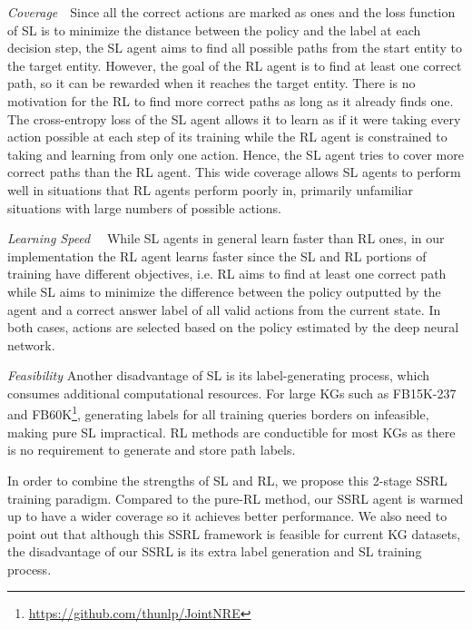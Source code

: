 \documentclass[lettersize,journal]{IEEEtran}
\begin{document}
\textit{Coverage}~~Since all the correct actions are marked as ones and the loss function of SL is to minimize the distance between the policy and the label at each decision step, the SL agent aims to find all possible paths from the start entity to the target entity. However, the goal of the RL agent is to find at least one correct path, so it can be rewarded when it reaches the target entity. There is no motivation for the RL to find more correct paths as long as it already finds one. The cross-entropy loss of the SL agent allows it to learn as if it were taking every action possible at each step of its training while the RL agent is constrained to taking and learning from only one action. Hence, the SL agent tries to cover more correct paths than the RL agent. This wide coverage allows SL agents to perform well in situations that RL agents perform poorly in, primarily unfamiliar situations with large numbers of possible actions.

\textit{Learning Speed}~~
While SL agents in general learn faster than RL ones, in our implementation the RL agent learns faster since the SL and RL portions of training have different objectives, i.e. RL aims to find at least one correct path while SL aims to minimize the difference between the policy outputted by the agent and a correct answer label of all valid actions from the current state. In both cases, actions are selected based on the policy estimated by the deep neural network.

\textit{Feasibility} Another disadvantage of SL is its label-generating process, which consumes additional computational resources. For large KGs such as FB15K-237 and FB60K\footnote{\url{https://github.com/thunlp/JointNRE}}, generating labels for all training queries borders on infeasible, making pure SL impractical. RL methods are conductible for most KGs as there is no requirement to generate and store path labels.

In order to combine the strengths of SL and RL, we propose this 2-stage SSRL training paradigm. Compared to the pure-RL method, our SSRL agent is warmed up to have a wider coverage so it achieves better performance. We also need to point out that although this SSRL framework is feasible for current KG datasets, the disadvantage of our SSRL is its extra label generation and SL training process.   
\end{document}
